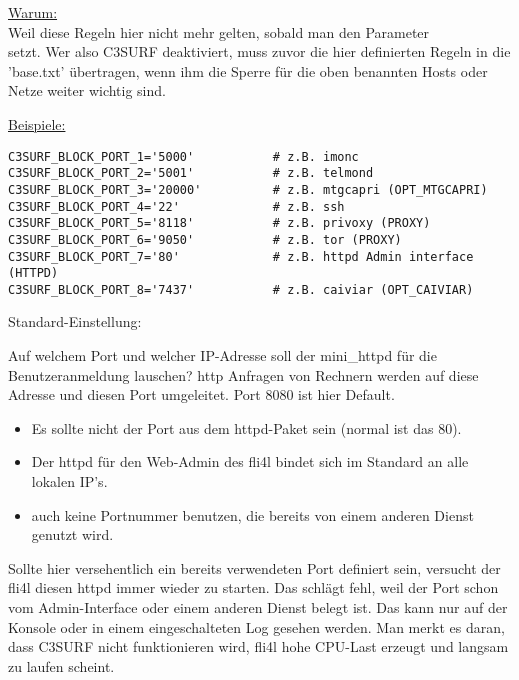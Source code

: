 \begin{itemize}
\begin{description}
   \underline{Warum:}\\
   Weil diese Regeln hier nicht mehr gelten, sobald man den Parameter\\
    setzt. Wer also C3SURF deaktiviert, muss zuvor die hier
   definierten Regeln in die 'base.txt' übertragen, wenn ihm die Sperre
   für die oben benannten Hosts oder Netze weiter wichtig sind.




\underline{Beispiele:}
\begin{example}
\begin{verbatim}
C3SURF_BLOCK_PORT_1='5000'           # z.B. imonc
C3SURF_BLOCK_PORT_2='5001'           # z.B. telmond
C3SURF_BLOCK_PORT_3='20000'          # z.B. mtgcapri (OPT_MTGCAPRI)
C3SURF_BLOCK_PORT_4='22'             # z.B. ssh
C3SURF_BLOCK_PORT_5='8118'           # z.B. privoxy (PROXY)
C3SURF_BLOCK_PORT_6='9050'           # z.B. tor (PROXY)
C3SURF_BLOCK_PORT_7='80'             # z.B. httpd Admin interface (HTTPD)
C3SURF_BLOCK_PORT_8='7437'           # z.B. caiviar (OPT_CAIVIAR)
\end{verbatim}
\end{example}


  Standard-Einstellung: 

  Auf welchem Port und welcher IP-Adresse soll der mini\_httpd für
  die Benutzeranmeldung lauschen? http Anfragen von Rechnern werden auf 
  diese Adresse und diesen Port umgeleitet. Port 8080 ist hier Default.

  \begin{itemize}
  \item Es sollte nicht der Port aus dem httpd-Paket sein (normal ist das 80).
  \item Der httpd für den Web-Admin des fli4l bindet sich im Standard an alle lokalen IP's.
  \item auch keine Portnummer benutzen, die bereits von einem anderen Dienst genutzt wird.\\
  \end{itemize}
  Sollte hier versehentlich ein bereits verwendeten Port definiert sein,
  versucht der fli4l diesen httpd immer wieder zu starten. Das schlägt fehl,
  weil der Port schon vom Admin-Interface oder einem anderen Dienst belegt ist.
  Das kann nur auf der Konsole oder in einem eingeschalteten Log gesehen werden.
  Man merkt es daran, dass C3SURF nicht funktionieren wird, fli4l hohe CPU-Last
  erzeugt und langsam zu laufen scheint.


\end{description}
\end{itemize}
